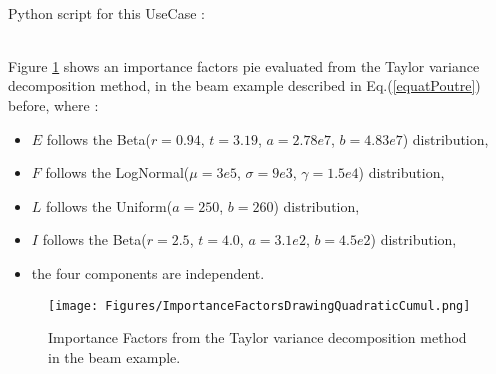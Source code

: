             \textspace\\
             Python script for this UseCase :


             \textspace\\

             Figure \ref{quadraticCumulImportanceFactors}  shows an importance factors pie evaluated from the Taylor variance decomposition method, in the beam example described in Eq.(\ref{equatPoutre}) before, where :
             \begin{itemize}
             \item $E$ follows the Beta($r = 0.94$, $t = 3.19$, $a = 2.78e7$, $b = 4.83e7$) distribution,
             \item $F$ follows the LogNormal($\mu = 3e5$, $\sigma = 9e3$, $\gamma = 1.5e4$)  distribution,
             \item $L$ follows the Uniform($a = 250$, $b=260$) distribution,
             \item $I$ follows the Beta($r = 2.5$, $t = 4.0$, $a = 3.1e2$, $b = 4.5e2$) distribution,
             \item the four components are independent.
             \end{itemize}



             \begin{figure}[H]
               \begin{center}
                 \texttt{[image: Figures/ImportanceFactorsDrawingQuadraticCumul.png]}
               \end{center}
               \caption{Importance Factors from the Taylor variance decomposition method in the beam example.}
               \label{quadraticCumulImportanceFactors}
             \end{figure}
